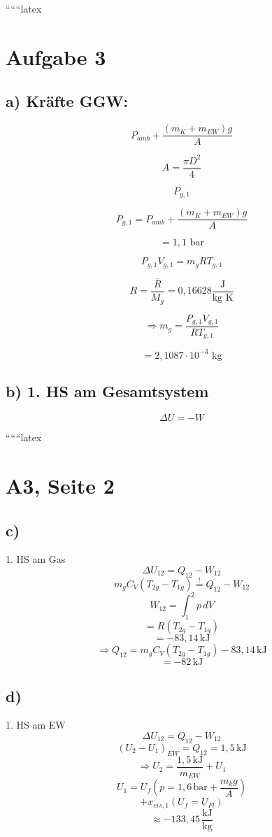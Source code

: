 
``````latex


\section*{Aufgabe 3}

\subsection*{a) Kräfte GGW:}

\[
P_{amb} + \frac{(m_K + m_{EW})g}{A}
\]

\[
A = \frac{\pi D^2}{4}
\]

\[
P_{g,1}
\]

\[
P_{g,1} = P_{amb} + \frac{(m_K + m_{EW})g}{A}
\]

\[
= 1,1 \text{ bar}
\]

\[
P_{g,1} V_{g,1} = m_g R T_{g,1}
\]

\[
R = \frac{\overline{R}}{M_g} = 0,16628 \frac{\text{J}}{\text{kg K}}
\]

\[
\Rightarrow m_g = \frac{P_{g,1} V_{g,1}}{R T_{g,1}}
\]

\[
= 2,1087 \cdot 10^{-3} \text{ kg}
\]

\subsection*{b) 1. HS am Gesamtsystem}

\[
\Delta U = -W
\]

``````latex


\section*{A3, Seite 2}

\subsection*{c)}
1. HS am Gas
\[
\Delta U_{12} = Q_{12} - W_{12}
\]
\[
m_g C_V (T_{2g} - T_{1g}) \stackrel{!}{=} Q_{12} - W_{12}
\]
\[
W_{12} = \int_{1}^{2} p \, dV
\]
\[
= R (T_{2g} - T_{1g})
\]
\[
= -83,14 \, \text{kJ}
\]
\[
\Rightarrow Q_{12} = m_g C_V (T_{2g} - T_{1g}) - 83,14 \, \text{kJ}
\]
\[
= -82 \, \text{kJ}
\]

\subsection*{d)}
1. HS am EW
\[
\Delta U_{12} = Q_{12} - W_{12}
\]
\[
(U_2 - U_1)_{EW} = Q_{12} = 1,5 \, \text{kJ}
\]
\[
\Rightarrow U_2 = \frac{1,5 \, \text{kJ}}{m_{EW}} + U_1
\]
\[
U_1 = U_f \left( p = 1,6 \, \text{bar} + \frac{m_k g}{A} \right)
\]
\[
+ x_{eis,1} (U_f = U_{Fl})
\]
\[
\approx -133,45 \, \frac{\text{kJ}}{\text{kg}}
\]

